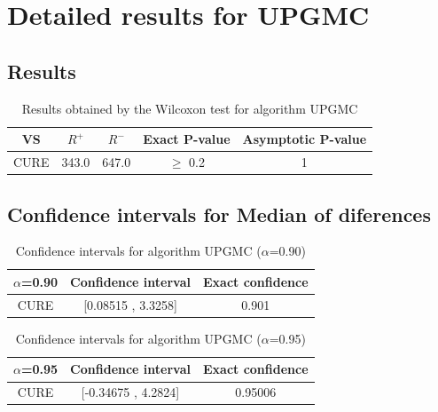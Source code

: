 \documentclass[a4paper,10pt]{article}
\begin{document}
 \clearpage 


\section{Detailed results for UPGMC}


\subsection{Results}

\begin{table}[!htp]
\centering\small
\begin{tabular}{
|c|c|c|c|c|}
\hline
 VS & $R^{+}$ & $R^{-}$ & Exact P-value & Asymptotic P-value \\ \hline 
CURE & 343.0 & 647.0 & $\geq$ 0.2 & 1\\ \hline 

\end{tabular}
\caption{Results obtained by the Wilcoxon test for algorithm UPGMC}
\end{table}

\subsection{Confidence intervals for Median of diferences}

\begin{table}[!htp]
\centering\small
\begin{tabular}{
|c|c|c|}
\hline
 $\alpha$=0.90 & Confidence interval & Exact confidence \\ \hline 
CURE & [0.08515 , 3.3258] & 0.901\\ \hline 

\end{tabular}
\caption{Confidence intervals for algorithm UPGMC ($\alpha$=0.90)}
\end{table}
\begin{table}[!htp]
\centering\small
\begin{tabular}{
|c|c|c|}
\hline
 $\alpha$=0.95 & Confidence interval & Exact confidence \\ \hline 
CURE & [-0.34675 , 4.2824] & 0.95006\\ \hline 

\end{tabular}
\caption{Confidence intervals for algorithm UPGMC ($\alpha$=0.95)}
\end{table}

 \clearpage 
\end{document}
